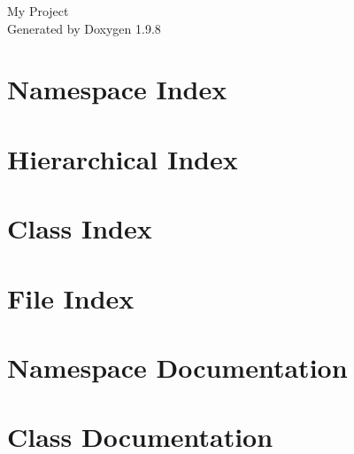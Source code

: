 \documentclass[twoside]{book}
\newcommand{\+}{\discretionary{\mbox{\scriptsize$\hookleftarrow$}}{}{}}
\newcommand{\clearemptydoublepage}{%
    \newpage{\pagestyle{empty}\cleardoublepage}%
  }
\begin{document}
  \raggedbottom
    \hypersetup{pageanchor=false,
                bookmarksnumbered=true,
                pdfencoding=unicode
               }
  \begin{titlepage}
  \vspace*{7cm}
  \begin{center}%
  {\Large My Project}\\
  \vspace*{1cm}
  {\large Generated by Doxygen 1.9.8}\\
  \end{center}
  \end{titlepage}
  \clearemptydoublepage
  \tableofcontents
  \clearemptydoublepage
  \hypersetup{pageanchor=true}




\chapter{Namespace Index}

\chapter{Hierarchical Index}

\chapter{Class Index}

\chapter{File Index}

\chapter{Namespace Documentation}





\chapter{Class Documentation}



\end{document}
